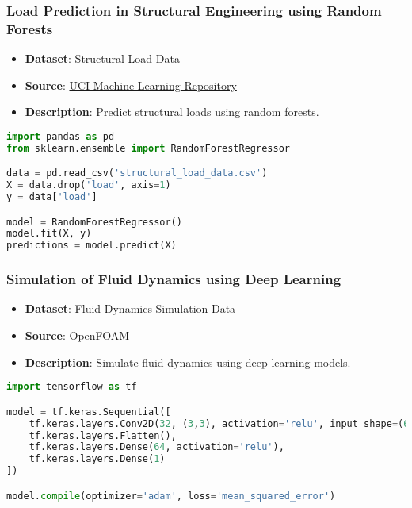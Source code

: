 \begin{frame}[fragile]\frametitle{Load Prediction in Structural Engineering using Random Forests}
    \begin{itemize}
        \item \textbf{Dataset}: Structural Load Data
        \item \textbf{Source}: \href{https://archive.ics.uci.edu/ml/datasets/Structural+Load+Prediction}{UCI Machine Learning Repository}
        \item \textbf{Description}: Predict structural loads using random forests.
    \end{itemize}
    \begin{lstlisting}[language=Python]
import pandas as pd
from sklearn.ensemble import RandomForestRegressor

data = pd.read_csv('structural_load_data.csv')
X = data.drop('load', axis=1)
y = data['load']

model = RandomForestRegressor()
model.fit(X, y)
predictions = model.predict(X)
    \end{lstlisting}
\end{frame}

\begin{frame}[fragile]\frametitle{Simulation of Fluid Dynamics using Deep Learning}
    \begin{itemize}
        \item \textbf{Dataset}: Fluid Dynamics Simulation Data
        \item \textbf{Source}: \href{https://www.openfoam.com/}{OpenFOAM}
        \item \textbf{Description}: Simulate fluid dynamics using deep learning models.
    \end{itemize}
    \begin{lstlisting}[language=Python]
import tensorflow as tf

model = tf.keras.Sequential([
    tf.keras.layers.Conv2D(32, (3,3), activation='relu', input_shape=(64,64,1)),
    tf.keras.layers.Flatten(),
    tf.keras.layers.Dense(64, activation='relu'),
    tf.keras.layers.Dense(1)
])

model.compile(optimizer='adam', loss='mean_squared_error')
    \end{lstlisting}
\end{frame}

